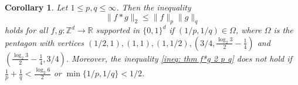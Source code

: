 \documentclass[reqno, 10pt]{amsart}
\theoremstyle{plain}
\numberwithin{equation}{section}
\newtheorem{corollary}[theorem]{Corollary}
\theoremstyle{definition}
\newtheorem*{induction hypothesis}{Induction hypothesis}
\theoremstyle{remark}
\newcommand{\R}{\mathbb{R}}
\newcommand{\Z}{\mathbb{Z}}
\begin{document}
\begin{corollary}\label{cor:r=2}
Let $1\leq p,q \leq \infty$. Then
the inequality
\begin{equation}\label{ineq: thm f*g 2 p q}
\|f*g\|_2\leq \|f\|_{p}\|g\|_q
\end{equation}
holds for all $f,g:\Z^d\to \R$ supported in $\{0,1\}^d$ if $(1/p,1/q)\in \Omega$, where $\Omega$ is the pentagon with vertices $(1/2,1),(1,1),(1,1/2),(3/4,\frac{\log_2 3}{2}-\frac{1}{4})$ and $(\frac{\log_2 3}{2}-\frac{1}{4},3/4)$. Moreover, the inequality \eqref{ineq: thm f*g 2 p q} does not hold if $\frac{1}{p}+\frac{1}{q}<\frac{\log_2 6}{2}$ or $\min\{1/p,1/q\}<1/2$.
\end{corollary}
\end{document}

